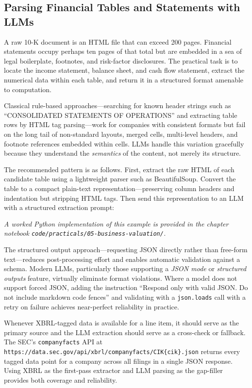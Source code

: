 \begin{context}
\subsection{Parsing Financial Tables and Statements with LLMs}
\label{subsec:bv-extraction-parsing}

A raw 10-K document is an HTML file that can exceed 200 pages. Financial statements
occupy perhaps ten pages of that total but are embedded in a sea of legal boilerplate,
footnotes, and risk-factor disclosures. The practical task is to locate the income
statement, balance sheet, and cash flow statement, extract the numerical data within
each table, and return it in a structured format amenable to computation.

Classical rule-based approaches---searching for known header strings such as
``CONSOLIDATED STATEMENTS OF OPERATIONS'' and extracting table rows by HTML tag
parsing---work for companies with consistent formats but fail on the long tail of
non-standard layouts, merged cells, multi-level headers, and footnote references
embedded within cells. LLMs handle this variation gracefully because they understand
the \emph{semantics} of the content, not merely its structure.

The recommended pattern is as follows. First, extract the raw HTML of each candidate
table using a lightweight parser such as BeautifulSoup. Convert the table to a compact
plain-text representation---preserving column headers and indentation but stripping
HTML tags. Then send this representation to an LLM with a structured extraction prompt:

\textit{A worked Python implementation of this example is provided in the chapter notebook \texttt{code/practicals/05-business-valuation/}.}

The structured output approach---requesting JSON directly rather than free-form
text---reduces post-processing effort and enables automatic validation against a schema.
Modern LLMs, particularly those supporting a \emph{JSON mode} or \emph{structured
outputs} feature, virtually eliminate format violations. Where a model does not support
forced JSON, adding the instruction ``Respond only with valid JSON. Do not include
markdown code fences'' and validating with a \texttt{json.loads} call with a retry on
failure achieves near-perfect reliability in practice.

\begin{remark}
\label{rem:xbrl-groundtruth}
Whenever XBRL-tagged data is available for a line item, it should serve as the primary
source and the LLM extraction should serve as a cross-check or fallback. The SEC's
\texttt{companyfacts} API at \texttt{https://data.sec.gov/api/xbrl/companyfacts/CIK\{cik\}.json}
returns every tagged data point for a company across all filings in a single JSON
response. Using XBRL as the first-pass extractor and LLM parsing as the gap-filler
provides both coverage and reliability.
\end{remark}


\end{context}
